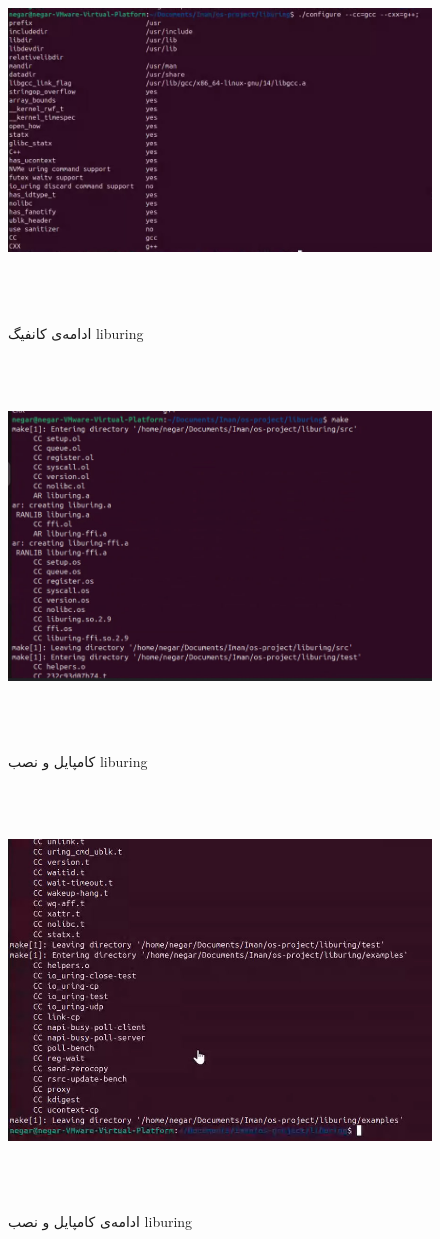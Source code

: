 ‫
‫‫‫\begin{figure}[H]
‫	‫	‫	‫    \centering
‫	‫	‫	‫    \includegraphics[width=\textwidth]{figs/22.jpg}
‫			\caption{ادامه‌ی کانفیگ liburing}
‫\end{figure}
‫
‫‫‫\begin{figure}[H]
‫	‫	‫	‫	‫    \centering
‫	‫	‫	‫	‫    \includegraphics[width=\textwidth]{figs/23.jpg}
‫	‫			\caption{کامپایل و نصب liburing}
‫‫\end{figure}
‫
‫‫‫\begin{figure}[H]
‫	‫	‫	‫	‫    \centering
‫	‫	‫	‫	‫    \includegraphics[width=\textwidth]{figs/24.jpg}
‫	‫			\caption{ادامه‌ی کامپایل و نصب liburing}
‫‫\end{figure}
